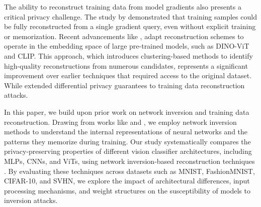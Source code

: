 The ability to reconstruct training data from model gradients also presents a critical privacy challenge. The study by \cite{wang2023reconstructingtrainingdatamodel} demonstrated that training samples could be fully reconstructed from a single gradient query, even without explicit training or memorization. Recent advancements like \cite{oz2024reconstructingtrainingdatareal}, adapt reconstruction schemes to operate in the embedding space of large pre-trained models, such as DINO-ViT and CLIP. This approach, which introduces clustering-based methods to identify high-quality reconstructions from numerous candidates, represents a significant improvement over earlier techniques that required access to the original dataset. While \cite{pmlr-v162-guo22c} extended differential privacy guarantees to training data reconstruction attacks.

In this paper, we build upon prior work on network inversion and training data reconstruction. Drawing from works like \cite{suhail2024networkcnn} and \cite{suhail2024networkinversionapplications}, we employ network inversion methods to understand the internal representations of neural networks and the patterns they memorize during training. Our study systematically compares the privacy-preserving properties of different vision classifier architectures, including MLPs, CNNs, and ViTs, using network inversion-based reconstruction techniques \cite{suhail2024net}. By evaluating these techniques across datasets such as MNIST, FashionMNIST, CIFAR-10, and SVHN, we explore the impact of architectural differences, input processing mechanisms, and weight structures on the susceptibility of models to inversion attacks.